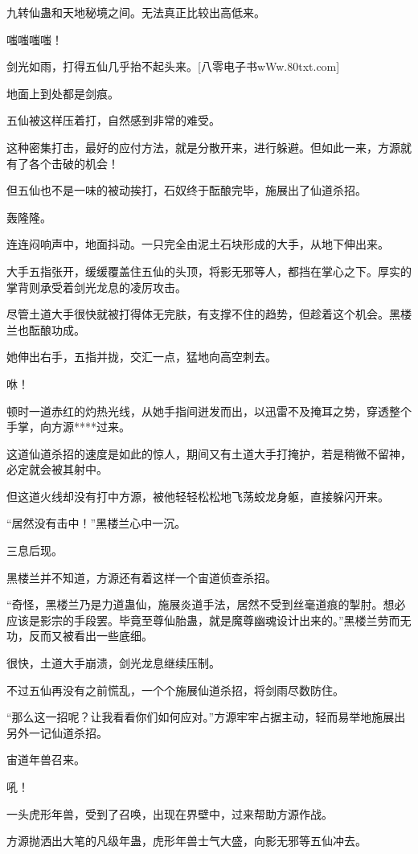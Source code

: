 \begin{this_body}
九转仙蛊和天地秘境之间。无法真正比较出高低来。

嗤嗤嗤嗤！

剑光如雨，打得五仙几乎抬不起头来。[八零电子书wWw.80txt.com]

地面上到处都是剑痕。

五仙被这样压着打，自然感到非常的难受。

这种密集打击，最好的应付方法，就是分散开来，进行躲避。但如此一来，方源就有了各个击破的机会！

但五仙也不是一味的被动挨打，石奴终于酝酿完毕，施展出了仙道杀招。

轰隆隆。

连连闷响声中，地面抖动。一只完全由泥土石块形成的大手，从地下伸出来。

大手五指张开，缓缓覆盖住五仙的头顶，将影无邪等人，都挡在掌心之下。厚实的掌背则承受着剑光龙息的凌厉攻击。

尽管土道大手很快就被打得体无完肤，有支撑不住的趋势，但趁着这个机会。黑楼兰也酝酿功成。

她伸出右手，五指并拢，交汇一点，猛地向高空刺去。

咻！

顿时一道赤红的灼热光线，从她手指间迸发而出，以迅雷不及掩耳之势，穿透整个手掌，向方源****过来。

这道仙道杀招的速度是如此的惊人，期间又有土道大手打掩护，若是稍微不留神，必定就会被其射中。

但这道火线却没有打中方源，被他轻轻松松地飞荡蛟龙身躯，直接躲闪开来。

“居然没有击中！”黑楼兰心中一沉。

三息后现。

黑楼兰并不知道，方源还有着这样一个宙道侦查杀招。

“奇怪，黑楼兰乃是力道蛊仙，施展炎道手法，居然不受到丝毫道痕的掣肘。想必应该是影宗的手段罢。毕竟至尊仙胎蛊，就是魔尊幽魂设计出来的。”黑楼兰劳而无功，反而又被看出一些底细。

很快，土道大手崩溃，剑光龙息继续压制。

不过五仙再没有之前慌乱，一个个施展仙道杀招，将剑雨尽数防住。

“那么这一招呢？让我看看你们如何应对。”方源牢牢占据主动，轻而易举地施展出另外一记仙道杀招。

宙道年兽召来。

吼！

一头虎形年兽，受到了召唤，出现在界壁中，过来帮助方源作战。

方源抛洒出大笔的凡级年蛊，虎形年兽士气大盛，向影无邪等五仙冲去。


\end{this_body}
